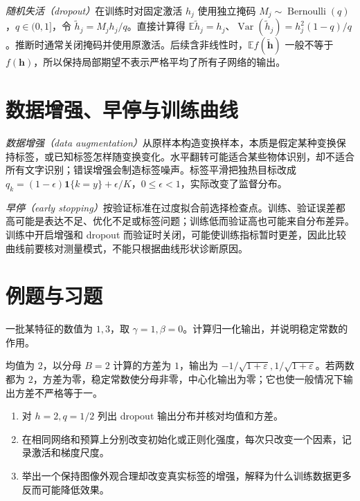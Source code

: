 \emph{随机失活（dropout）}在训练时对固定激活 $h_j$ 使用独立掩码 $M_j\sim\operatorname{Bernoulli}(q)$，$q\in(0,1]$，令 $\widetilde h_j=M_jh_j/q$。直接计算得 $\mathbb E\widetilde h_j=h_j$、$\operatorname{Var}(\widetilde h_j)=h_j^2(1-q)/q$。推断时通常关闭掩码并使用原激活。后续含非线性时，$\mathbb E f(\widetilde{\mathbf h})$ 一般不等于 $f(\mathbf h)$，所以保持局部期望不表示严格平均了所有子网络的输出。

\section{数据增强、早停与训练曲线}
\emph{数据增强（data augmentation）}从原样本构造变换样本，本质是假定某种变换保持标签，或已知标签怎样随变换变化。水平翻转可能适合某些物体识别，却不适合所有文字识别；错误增强会制造标签噪声。标签平滑把独热目标改成 $q_k=(1-\epsilon)\mathbf1\{k=y\}+\epsilon/K$，$0\leq\epsilon<1$，实际改变了监督分布。

\emph{早停（early stopping）}按验证标准在过度拟合前选择检查点。训练、验证误差都高可能是表达不足、优化不足或标签问题；训练低而验证高也可能来自分布差异。训练中开启增强和 dropout 而验证时关闭，可能使训练指标暂时更差，因此比较曲线前要核对测量模式，不能只根据曲线形状诊断原因。

\section{例题与习题}
\begin{example}[归一化的具体计算]
一批某特征的数值为 $1,3$，取 $\gamma=1,\beta=0$。计算归一化输出，并说明稳定常数的作用。
\end{example}
\begin{solve}
均值为 $2$，以分母 $B=2$ 计算的方差为 $1$，输出为 $-1/\sqrt{1+\varepsilon},1/\sqrt{1+\varepsilon}$。若两数都为 $2$，方差为零，稳定常数使分母非零，中心化输出为零；它也使一般情况下输出方差不严格等于一。
\end{solve}
\begin{enumerate}
\item 对 $h=2,q=1/2$ 列出 dropout 输出分布并核对均值和方差。
\item 在相同网络和预算上分别改变初始化或正则化强度，每次只改变一个因素，记录激活和梯度尺度。
\item 举出一个保持图像外观合理却改变真实标签的增强，解释为什么训练数据更多反而可能降低效果。
\end{enumerate}

